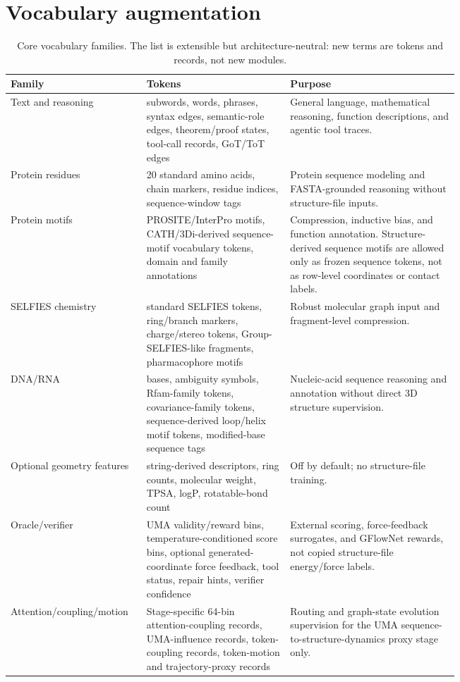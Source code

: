 \documentclass[11pt]{article}
\newcommand{\1}{\mathbf{1}}
\begin{document}
\section{Vocabulary augmentation}

\begingroup\scriptsize\setlength{\tabcolsep}{2pt}
\begin{longtable}{p{0.13\linewidth}p{0.28\linewidth}p{0.33\linewidth}}
\caption{Core vocabulary families. The list is extensible but architecture-neutral: new terms are tokens and records, not new modules.}\\
\toprule
Family & Tokens & Purpose \\
\midrule
\endhead
Text and reasoning & subwords, words, phrases, syntax edges, semantic-role edges, theorem/proof states, tool-call records, GoT/ToT edges & General language, mathematical reasoning, function descriptions, and agentic tool traces. \\
Protein residues & 20 standard amino acids, chain markers, residue indices, sequence-window tags & Protein sequence modeling and FASTA-grounded reasoning without structure-file inputs. \\
Protein motifs & PROSITE/InterPro motifs, CATH/3Di-derived sequence-motif vocabulary tokens, domain and family annotations & Compression, inductive bias, and function annotation. Structure-derived sequence motifs are allowed only as frozen sequence tokens, not as row-level coordinates or contact labels. \\
SELFIES chemistry & standard SELFIES tokens, ring/branch markers, charge/stereo tokens, Group-SELFIES-like fragments, pharmacophore motifs & Robust molecular graph input and fragment-level compression. \\
DNA/RNA & bases, ambiguity symbols, Rfam-family tokens, covariance-family tokens, sequence-derived loop/helix motif tokens, modified-base sequence tags & Nucleic-acid sequence reasoning and annotation without direct 3D structure supervision. \\
Optional geometry features & string-derived descriptors, ring counts, molecular weight, TPSA, logP, rotatable-bond count & Off by default; no structure-file training. \\
Oracle/verifier & UMA validity/reward bins, temperature-conditioned score bins, optional generated-coordinate force feedback, tool status, repair hints, verifier confidence & External scoring, force-feedback surrogates, and GFlowNet rewards, not copied structure-file energy/force labels. \\
Attention/coupling/motion & Stage-specific 64-bin attention-coupling records, UMA-influence records, token-coupling records, token-motion and trajectory-proxy records & Routing and graph-state evolution supervision for the UMA sequence-to-structure-dynamics proxy stage only. \\
\bottomrule

\end{longtable}\endgroup
\end{document}
